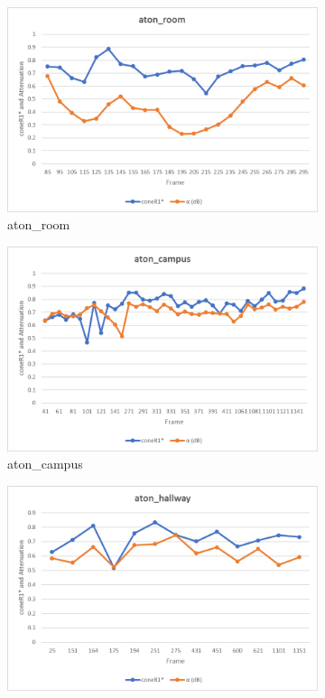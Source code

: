 \begin{appendices}
\begin{figure}
  \begin{subfigure}{.45\linewidth}
  \includegraphics[width=1\linewidth]{figures/appendix/room_db.jpg}
  \caption{aton\_room}
\end{subfigure}
\hfill
\begin{subfigure}{.45\linewidth}
  \includegraphics[width=1\linewidth]{figures/appendix/campus_db.jpg}
  \caption{aton\_campus}
\end{subfigure}
\hfill
\begin{subfigure}{.45\linewidth}
  \includegraphics[width=1\linewidth]{figures/appendix/hallway_db.jpg}

\end{subfigure}
\end{figure}
\end{appendices}
